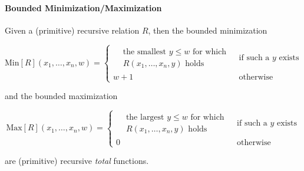 \paragraph{Bounded Minimization/Maximization}

Given a (primitive) recursive relation $R$, then the bounded minimization

$$
\mathrm{Min}[R](x_1, \ldots, x_n, w) = 
\begin{cases}
    \begin{aligned}
      &\textrm{the smallest } y \leq w \textrm{ for which } \\
      &R(x_1, \ldots, x_n, y) \textrm{ holds}
    \end{aligned}
    & \textrm{if such a } y \textrm{ exists} \\
    w + 1 & \textrm{otherwise}
\end{cases}
$$

and the bounded maximization

$$
\mathrm{Max}[R](x_1, \ldots, x_n, w) = 
\begin{cases}
    \begin{aligned}
      &\textrm{the largest } y \leq w \textrm{ for which } \\
      &R(x_1, \ldots, x_n, y) \textrm{ holds}
    \end{aligned}
    & \textrm{if such a } y \textrm{ exists} \\
    0 & \textrm{otherwise}
\end{cases}
$$

are (primitive) recursive \textit{total} functions.

